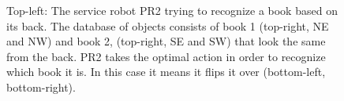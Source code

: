 \begin{figure}[ht]
\begin{tabular}{cccc}
    \end{tabular}
    \caption{Top-left: The service robot PR2 trying to recognize a book based on its back. The database of objects consists of book 1 (top-right, NE and NW) and book 2, (top-right, SE and SW) that look the same from the back. PR2 takes the optimal action in order to recognize which book it is. In this case it means it flips it over (bottom-left, bottom-right).}
    \vspace{-4ex}

    \label{fig:pr2}
    \end{figure}


